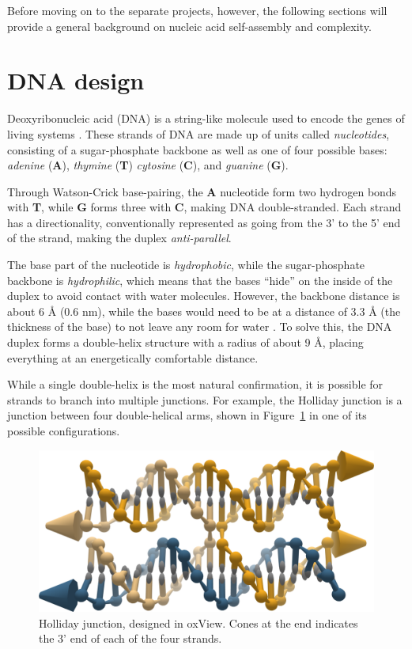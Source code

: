 Before moving on to the separate projects, however, the following sections will provide a general background on nucleic acid self-assembly and complexity.



\section{DNA design}
Deoxyribonucleic acid (DNA) is a string-like molecule used to encode the genes of living systems \cite{calladine1997understanding}. These strands of DNA are made up of units called \emph{nucleotides}, consisting of a sugar-phosphate backbone as well as one of four possible bases: \emph{adenine} (\textbf{A}), \emph{thymine} (\textbf{T}) \emph{cytosine} (\textbf{C}), and \emph{guanine} (\textbf{G}).

Through Watson-Crick base-pairing, the \textbf{A} nucleotide form two hydrogen bonds with \textbf{T}, while \textbf{G} forms three with \textbf{C}, making DNA double-stranded. Each strand has a directionality, conventionally represented as going from the 3' to the 5' end of the strand, making the duplex \emph{anti-parallel}.

The base part of the nucleotide is \emph{hydrophobic}, while the sugar-phosphate backbone is \emph{hydrophilic}, which means that the bases ``hide'' on the inside of the duplex to avoid contact with water molecules. However, the backbone distance is about 6 Å (0.6 nm), while the bases would need to be at a distance of 3.3 Å (the thickness of the base) to not leave any room for water \cite{calladine1997understanding}. To solve this, the DNA duplex forms a double-helix structure with a radius of about 9 Å, placing everything at an energetically comfortable distance.

While a single double-helix is the most natural confirmation, it is possible for strands to branch into multiple junctions. For example, the Holliday junction is a junction between four double-helical arms, shown in Figure~\ref{fig:holliday} in one of its possible configurations.

\begin{figure}
    \centering\includegraphics[width=\textwidth]{figures/holliday.png}
    \caption{Holliday junction, designed in oxView. Cones at the end indicates the 3' end of each of the four strands.}
    \label{fig:holliday}
\end{figure}

